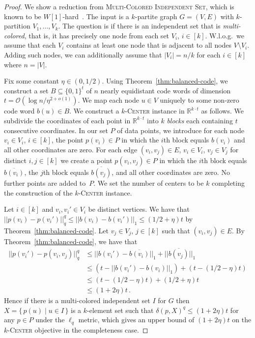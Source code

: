 \documentclass[11pt]{article}
\newcommand{\kc}{\textsc{$k$-Center}\xspace}
\newcommand{\mcis}{\textsc{Multi-Colored Independent Set}\xspace}
\newcommand{\OO}{\mathcal{O}}
\newcommand{\bR}{\ensuremath{\mathbb{R}}\xspace}
\begin{document}
\begin{proof}
We show a reduction from \mcis, which is known to be $W[1]$-hard~\cite{CyganFKLMPPS15}. The input is a $k$-partite graph $G=(V,E)$ with $k$-partition $V_1,\dots,V_k$. The question is if there is an independent set that is \emph{multi-colored}, that is, it has precisely one node from each set $V_i$, $i\in[k]$. W.l.o.g.\ we assume that each $V_i$ contains at least one node that is adjacent to all nodes $V\setminus V_i$. Adding such nodes, we can additionally assume that $|V_i|=n/k$ for each $i\in[k]$ where $n=|V|$.

Fix some constant $\eta\in(0,1/2)$. Using Theorem~\ref{thm:balanced-code}, we construct a set $B\subseteq\{0,1\}^t$ of $n$ nearly equidistant code words of dimension $t=\OO(\log n / \eta^{2+o(1)})$. We map each node $u\in V$ uniquely to some non-zero code word $b(u)\in B$. 
We construct a \kc instance in $\bR^{k\cdot t}$ as follows. We subdivide the coordinates of each point in $\bR^{k\cdot t}$ into $k$ \emph{blocks} each containing $t$ consecutive coordinates. In our set $P$ of data points, we introduce for each node $v_i\in V_i$, $i\in [k]$, the point $p(v_i)\in P$ in which the $i$th block equals $b(v_i)$ and all other coordinates are zero. For each edge $(v_i,v_j)\in E$, $v_i\in V_i$, $v_j\in V_j$ for distinct $i,j\in[k]$ we create a point $p(v_i,v_j)\in P$ in which the $i$th block equals $\overline{b(v_i)}$, the $j$th block equals $\overline{b(v_j)}$, and all other coordinates are zero. No further points are added to~$P$. We set the number of centers to be $k$ completing the construction of the \kc instance.

Let $i\in [k]$ and $v_i,v_i'\in V_i$ be distinct vertices. We have that $||p(v_i)-p(v_i')||_q^q\leq ||b(v_i)-b(v_i')||_1\leq (1/2+\eta)t$ by Theorem~\ref{thm:balanced-code}. Let $v_j\in V_j$, $j\in [k]$ such that $(v_i,v_j)\in E$. By Theorem~\ref{thm:balanced-code}, we have that 
\begin{align*}
 ||p(v_i')-p(v_i,v_j)||_q^q & \leq ||b(v_i')-\overline{b(v_i)}||_1
+||\overline{b(v_j)}||_1\\
  & \leq (t-||b(v_i')-b(v_i)||_1)+(t-(1/2-\eta)t)\\
  & \leq (t-(1/2-\eta)t)+(1/2+\eta)t\\
 & \leq (1+2\eta)t\,.
\end{align*}
Hence if there is a multi-colored independent set $I$ for $G$ then $X=\{\,p(u)\mid u\in I\,\}$ is a $k$-element set such that $\delta(p,X)^q\leq (1+2\eta)t$ for any $p\in P$ under the $\ell_q$ metric, which gives an upper bound of $(1+2\eta)t$ on the \kc objective in the completeness case.


\end{proof}
\end{document}
